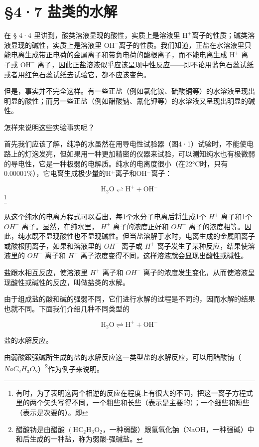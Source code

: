 \section{§4·7 盐类的水解}

在 § 4·4 里讲到，酸类溶液显现的酸性，实质上是溶液里
\(\mathrm{H}^{+}\)离子的性质；碱类溶液显现的碱性，实质上是溶液里
\(\mathrm{OH}^{-}\)离子的性质。我们知道，正盐在水溶液里只能电离生成带正电荷的金属离子和带负电荷的酸根离子，而不能电离生成
\(\mathrm{H}^{+}\) 离子或 \(\mathrm{OH}^{-}\)
离子，因此正盐溶液似乎应该呈现中性反应------即不论用蓝色石蕊试纸或者用红色石蕊试纸去试验它，都不应该变色。

但是，事实并不完全这样。有一些正盐（例如氯化铵、硫酸铜等）的水溶液呈现出明显的酸性；而另一些正盐（例如醋酸钠、氰化钾等）的水溶液又呈现出明显的碱性。

怎样来说明这些实验事实呢？

首先我们应该了解，纯净的水虽然在用导电性试验器（图4·1）试验时，不能使电路上的灯泡发亮，但如果用一种更加精密的仪器来试验，可以测知纯水也有极微弱的导电性，它是一种极弱的电解质。纯水的电离度很小（在22°C时，只有0.00001\%），它电离生成极少量的H\(^{+}\)离子和OH\(^{-}\)离子：

\[
\mathrm{H} _ {2} \mathrm{O} \rightleftharpoons \mathrm{H} ^ {+} + \mathrm{OH} ^ {-} 
\] \footnote{有时，为了表明这两个相逆的反应在程度上有很大的不同，把这一离子方程式里的两个矢头写得不同，一个粗些和长些（表示是主要的）；一个细些和短些（表示是次要的）。即}

从这个纯水的电离方程式可以看出，每1个水分子电离后将生成1个 \(H^{+}\)
离子和1个 \(OH^{-}\) 离子。显然，在纯水里， \(H^{+}\) 离子的浓度正好和
\(OH^{-}\)
离子的浓度相等。因此，纯水既不显现酸性也不显现碱性。但当盐溶解于水时，电离生成的金属阳离子或酸根阴离子，如果和溶液里的
\(OH^{-}\) 离子或 \(H^{+}\) 离子发生了某种反应，结果使溶液里的
\(OH^{-}\) 离子和 \(H^{+}\)
离子浓度变得不同，这样溶液就会显现出酸性或碱性。

盐跟水相互反应，使溶液里 \(H^{+}\) 离子和 \(OH^{-}\)
离子的浓度发生变化，从而使溶液呈现酸性或碱性的反应，叫做盐类的水解。

由于组成盐的酸和碱的强弱不同，它们进行水解的过程是不同的，因而水解的结果也就不同。下面我们介绍几种不同类型的

\[
\mathrm{H} _ {2} \mathrm{O} \rightleftharpoons \mathrm{H} ^ {+} + \mathrm{OH} ^ {-}
\]

盐的水解反应。

由弱酸跟强碱所生成的盐的水解反应这一类型盐的水解反应，可以用醋酸钠（\(NaC_{2}H_{3}O_{2}\)）\footnote{醋酸钠是由醋酸
  \(\left(\mathrm{HC}_{2}\mathrm{H}_{3}\mathrm{O}_{2}\right.\)，一种弱酸）跟氢氧化钠（NaOH，一种强碱）中和后生成的一种盐，称为弱酸-强碱盐。}作为例子来说明。

